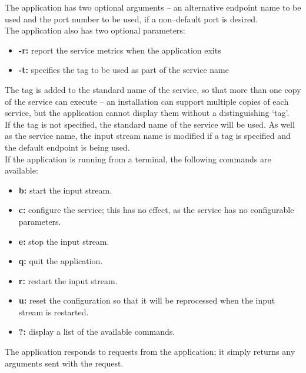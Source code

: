 The application has two optional arguments -- an alternative endpoint name to be used and
the port number to be used, if a non--default port is desired.\\

The application also has two optional parameters:
\begin{itemize}
\item \textbf{-r:} report the service metrics when the application exits
\item \textbf{-t:} specifies the tag to be used as part of the service name
\end{itemize}
The tag is added to the standard name of the service, so that more than one copy of the
service can execute -- an \mplusm{} installation can support multiple copies of each
 service, but the 
application cannot display them without a distinguishing `tag'.\\
If the tag is not specified, the standard name of the service will be used.
As well as the service name, the input stream name is modified if a tag is specified and
the default endpoint is being used.\\

If the application is running from a terminal, the following commands are available:
\begin{itemize}
\item \textbf{b:} start the input stream. 
\item \textbf{c:} configure the service; this has no effect, as the service has no
configurable parameters. 
\item \textbf{e:} stop the input stream. 
\item \textbf{q:} quit the application. 
\item \textbf{r:} restart the input stream.
\item \textbf{u:} reset the configuration so that it will be reprocessed when the input
stream is restarted. 
\item \textbf{?:} display a list of the available commands.
\end{itemize}
The  application responds to
 requests from the
 application; it simply returns any arguments
sent with the request.\\

